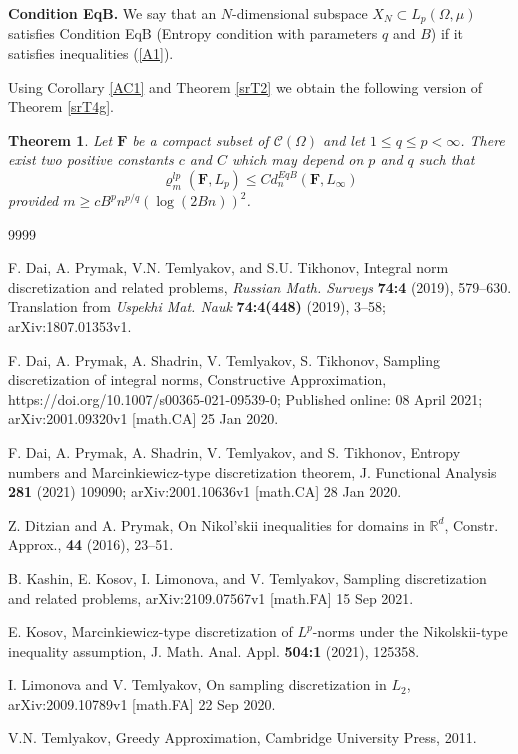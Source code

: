 \documentclass[12pt]{article}
\def\C{{\mathcal C}}
\def\R{{\mathbb R}}
\def \ro{\varrho}
\def\bF{\mathbf F}
\newtheorem{Theorem}{Theorem}[section]
\numberwithin{equation}{section}
\begin{document}
{\bf Condition EqB.} We say that an $N$-dimensional subspace $X_N\subset L_p(\Omega,\mu)$ satisfies Condition EqB (Entropy condition with parameters $q$ and $B$) if it satisfies inequalities (\ref{A1}).

Using Corollary \ref{AC1} and Theorem \ref{srT2} we obtain the following version of Theorem \ref{srT4g}.

\begin{Theorem}\label{srT5} Let $\bF$ be a compact subset of $\C(\Omega)$ and let $1\le q\le p<\infty$. There exist two positive   constants $c$ and $C$ which may depend on $p$ and $q$ such that
$$
\ro_{m}^{lp}(\bF,L_p) \le Cd_n^{EqB}(\bF,L_\infty)
$$
provided $m\ge cB^pn^{p/q}(\log(2Bn))^2$.
\end{Theorem}


\begin{thebibliography}{9999}

  F. Dai, A. Prymak, V.N. Temlyakov, and  S.U. Tikhonov, Integral norm discretization and related problems,
  {\it Russian Math. Surveys} {\bf 74:4} (2019),   579--630.
 Translation from
{\it Uspekhi Mat. Nauk}  {\bf 74:4(448)}  (2019),	3--58; arXiv:1807.01353v1.

 F. Dai, A. Prymak, A. Shadrin, V. Temlyakov, S. Tikhonov,
Sampling discretization of integral norms, Constructive Approximation, https://doi.org/10.1007/s00365-021-09539-0; Published online: 08 April 2021;
arXiv:2001.09320v1 [math.CA] 25 Jan 2020.

  F. Dai, A. Prymak, A. Shadrin, V. Temlyakov, and S. Tikhonov, Entropy numbers and Marcinkiewicz-type discretization theorem, J. Functional Analysis {\bf 281} (2021) 109090; arXiv:2001.10636v1 [math.CA] 28 Jan 2020.

 Z. Ditzian and A. Prymak, On Nikol'skii inequalities for domains in $\R^d$, Constr. Approx., {\bf 44} (2016), 23--51.

 B. Kashin, E. Kosov, I. Limonova, and V. Temlyakov, Sampling discretization and related problems, arXiv:2109.07567v1 [math.FA] 15 Sep 2021.

 E. Kosov, Marcinkiewicz-type discretization
of $L^p$-norms under the Nikolskii-type inequality assumption,
J. Math. Anal. Appl.
{\bf504:1} (2021), 125358.

 I. Limonova and V. Temlyakov, On sampling discretization in $L_2$, arXiv:2009.10789v1 [math.FA] 22 Sep 2020. 

 V.N. Temlyakov, Greedy Approximation, Cambridge University
Press, 2011.


\end{thebibliography}
\end{document}
